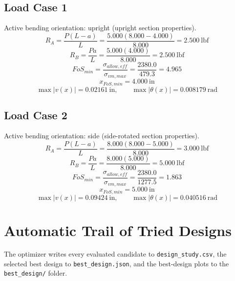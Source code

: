 \documentclass[11pt]{article}
\begin{document}
\subsection*{Load Case 1}
Active bending orientation: upright (upright section properties).
\[R_A = \frac{P(L-a)}{L} = \frac{5.000(8.000-4.000)}{8.000} = 2.500\ \mathrm{lbf}\]
\[R_B = \frac{Pa}{L} = \frac{5.000(4.000)}{8.000} = 2.500\ \mathrm{lbf}\]
\[FoS_{min} = \frac{\sigma_{allow,eff}}{\sigma_{vm,max}} = \frac{2380.0}{479.3} = 4.965\]
\[x_{FoS,min} = 4.000\ \mathrm{in}\]
\[\max |v(x)| = 0.02161\ \mathrm{in}, \qquad \max |\theta(x)| = 0.008179\ \mathrm{rad}\]
\subsection*{Load Case 2}
Active bending orientation: side (side-rotated section properties).
\[R_A = \frac{P(L-a)}{L} = \frac{8.000(8.000-5.000)}{8.000} = 3.000\ \mathrm{lbf}\]
\[R_B = \frac{Pa}{L} = \frac{8.000(5.000)}{8.000} = 5.000\ \mathrm{lbf}\]
\[FoS_{min} = \frac{\sigma_{allow,eff}}{\sigma_{vm,max}} = \frac{2380.0}{1277.5} = 1.863\]
\[x_{FoS,min} = 5.000\ \mathrm{in}\]
\[\max |v(x)| = 0.09424\ \mathrm{in}, \qquad \max |\theta(x)| = 0.040516\ \mathrm{rad}\]

\section*{Automatic Trail of Tried Designs}
The optimizer writes every evaluated candidate to \texttt{design\_study.csv}, the selected best design to \texttt{best\_design.json}, and the best-design plots to the \texttt{best\_design/} folder.
\end{document}
